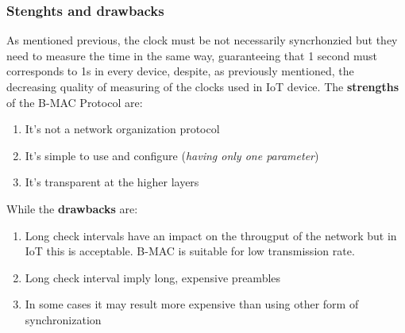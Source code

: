 \documentclass[10pt,a4paper]{report}
\theoremstyle{definition}
\begin{document}
\subsubsection{Stenghts and drawbacks}\label{sec:stenghts-and-drawbacks}
As mentioned previous, the clock must be not necessarily syncrhonzied but they need to measure the time in the same way, guaranteeing that 1 second must corresponds to 1s in every device, despite, as previously mentioned, the decreasing quality of measuring of the clocks used in IoT device.
The \textbf{strengths} of the B-MAC Protocol are:
\begin{enumerate}
	\item 
	It's not a network organization protocol
	\item 
	It's simple to use and configure (\textit{having only one parameter})
	\item 
	It's transparent at the higher layers
\end{enumerate}
	While the \textbf{drawbacks} are:
\begin{enumerate}

	\item 
	Long check intervals have an impact on the througput of the network but in IoT this is acceptable. B-MAC is suitable for low transmission rate.
	\item 
	Long check interval imply long, expensive preambles
	\item 
	In some cases it may result more expensive than using other form of synchronization
\end{enumerate}
\end{document}
